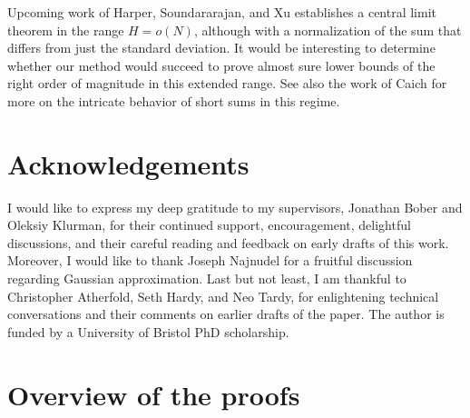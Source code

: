 \documentclass[11pt]{tran-l}
\theoremstyle{definition}
\theoremstyle{remark}
\numberwithin{equation}{section}
\begin{document}
Upcoming work of Harper, Soundararajan, and Xu 
establishes a central limit theorem in the range $H = o(N)$, although with a normalization of the sum that differs from just the standard deviation. It would be interesting to determine whether our method would succeed to prove almost sure lower bounds of the right order of magnitude in this extended range. See also the work of Caich \cite{Caich2024randomshort} for more on the intricate behavior of short sums in this regime. 




\section*{Acknowledgements}
I would like to express my deep gratitude to my supervisors, Jonathan Bober and Oleksiy Klurman, for their continued support, encouragement, delightful discussions, and their careful reading and feedback on early drafts of this work. Moreover, I would like to thank Joseph Najnudel for a fruitful discussion regarding Gaussian approximation. Last but not least, I am thankful to Christopher Atherfold, Seth Hardy, and Neo Tardy, for enlightening technical conversations and their comments on earlier drafts of the paper.  The author is funded by a University of Bristol PhD scholarship.

\section{Overview of the proofs}
\end{document}
